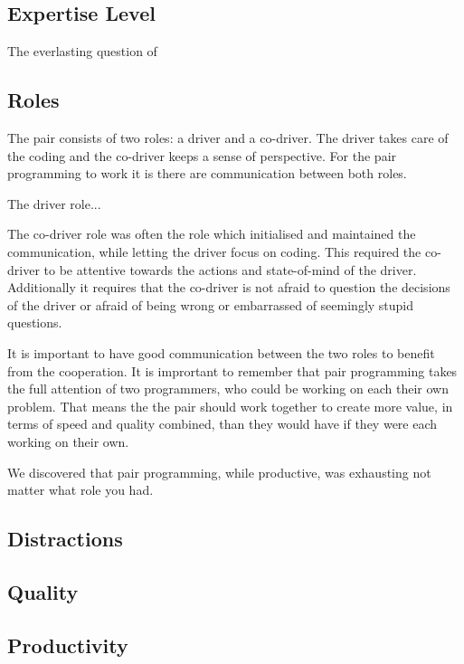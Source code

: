 \subsection{Expertise Level}
The everlasting question of 




\subsection{Roles}
The pair consists of two roles: a driver and a co-driver.
The driver takes care of the coding and the co-driver keeps a sense of perspective.
For the pair programming to work it is there are communication between both roles.



The driver role...





The co-driver role was often the role which initialised and maintained the communication, while letting the driver focus on coding.
This required the co-driver to be attentive towards the actions and state-of-mind of the driver.
Additionally it requires that the co-driver is not afraid to question the decisions of the driver or afraid of being wrong or embarrassed of seemingly stupid questions.








It is important to have good communication between the two roles to benefit from the cooperation.
It is imprortant to remember that pair programming takes the full attention of two programmers, who could be working on each their own problem.
That means the the pair should work together to create more value, in terms of speed and quality combined, than they would have if they were each working on their own.

We discovered that pair programming, while productive, was exhausting not matter what role you had.



\subsection{Distractions}



\subsection{Quality}



\subsection{Productivity}


